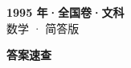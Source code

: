 \documentclass[zihao=-4, a4paper]{ctexart}
\begin{document}
\begin{center}
  {\Large\bfseries 1995 年·全国卷·文科}\\[4pt]
  {\large 数学 · 简答版}
\end{center}
\medskip
{}

\clearpage
{}
\begin{center}{\Large\bfseries 答案速查}\end{center}
\medskip

\end{document}
